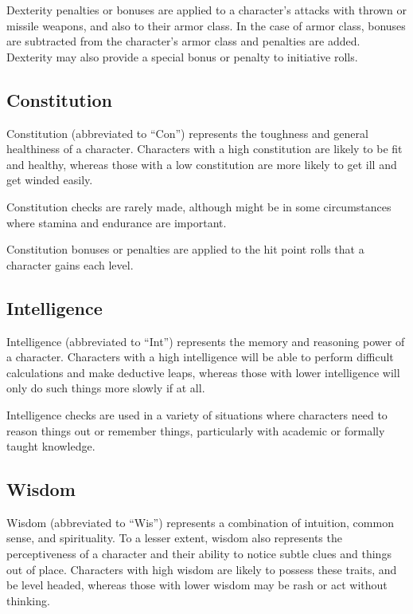 \begin{multicols*}{2}
Dexterity penalties or bonuses are applied to a character’s attacks with thrown or missile weapons, and also to their armor class. In the case of armor class, bonuses are subtracted from the character's armor class and penalties are added. Dexterity may also provide a special bonus or penalty to initiative rolls.

\subsection{Constitution}\label{sec:Constitution}
Constitution (abbreviated to “Con”) represents the toughness and general healthiness of a character. Characters with a high constitution are likely to be fit and healthy, whereas those with a low constitution are more likely to get ill and get winded easily.

Constitution checks are rarely made, although might be in some circumstances where stamina and endurance are important. 

Constitution bonuses or penalties are applied to the hit point rolls that a character gains each level.

\subsection{Intelligence}\label{sec:Intelligence}
Intelligence (abbreviated to “Int”) represents the memory and reasoning power of a character. Characters with a high intelligence will be able to perform difficult calculations and make deductive leaps, whereas those with lower intelligence will only do such things more slowly if at all.

Intelligence checks are used in a variety of situations where characters need to reason things out or remember things, particularly with academic or formally taught knowledge.

\subsection{Wisdom}\label{sec:Wisdom}
Wisdom (abbreviated to “Wis”) represents a combination of intuition, common sense, and spirituality. To a lesser extent, wisdom also represents the perceptiveness of a character and their ability to notice subtle clues and things out of place. Characters with high wisdom are likely to possess these traits, and be level headed, whereas those with lower wisdom may be rash or act without thinking.


\end{multicols*}
